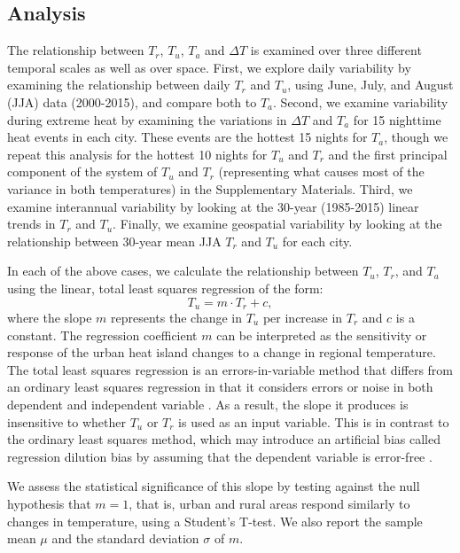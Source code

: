 \subsection{Analysis}
{%
The relationship between $T_r$, $T_u$, $T_{a}$ and $\Delta T$ is examined over three different temporal scales as well as over space. First, we explore daily variability by examining the relationship between daily $T_r$ and $T_u$, using June, July, and August (JJA) data (2000-2015), and compare both to $T_{a}$. Second, we examine variability during extreme heat by examining the variations in $\Delta T$ and $T_{a}$ for 15 nighttime heat events in each city. These events are the hottest 15 nights for $T_{a}$, though we repeat this analysis for the hottest 10 nights for $T_u$ and $T_r$ and the first principal component of the system of $T_u$ and $T_r$ (representing what causes most of the variance in both temperatures) in the Supplementary Materials.
Third, we examine interannual variability by looking at the 30-year (1985-2015) linear trends in $T_r$ and $ T_u$. Finally, we examine geospatial variability by looking at the relationship between 30-year mean JJA $T_r$ and $T_u$ for each city. 

In each of the above cases, we calculate the relationship between $T_u$, $T_r$, and $T_{a}$ using 
the linear, total least squares regression \citep{allen2003estimating}  of the form:
\begin{equation} \label{eq1}
T_u = m\cdot  {T_{r}} + c, 
\end{equation}
where the slope $m$ represents the change in $T_u$ per increase in $T_{r}$ and $c$ is a constant. 
The regression coefficient $m$ can be interpreted as the sensitivity or response of the urban heat island changes to a change in  regional temperature.  
The total least squares regression is an errors-in-variable method that differs from an ordinary least squares regression in that it considers errors or noise in both dependent and independent variable \citep{allen2003estimating}. As a result, the slope it produces is insensitive to whether $T_u$ or $T_r$ is used as an input variable. This is in contrast to the ordinary least squares method, which may introduce an artificial bias called regression dilution bias by assuming that the dependent variable is error-free \citep{pitkanen2016artificial}. 

We assess the statistical significance of this slope by testing against the null hypothesis that $m=1$, that is, urban and rural areas respond similarly to changes in temperature, using a Student's T-test. We also report the sample mean $\mu$ and the standard deviation $\sigma$ of $m$.

}
